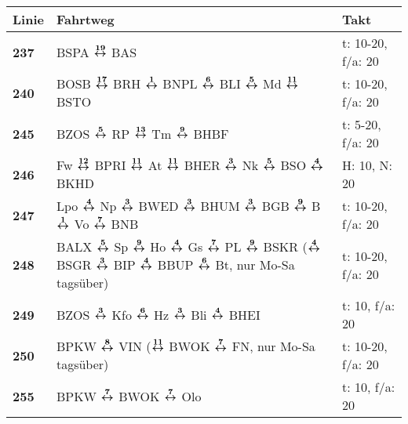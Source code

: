 \begin{minipage}[t]{0.45\textwidth}
\begin{tabular}{>{\bfseries}L{1.2cm}L{9.0cm}L{3.0cm}}
{\bfseries Linie} & {\bfseries Fahrtweg} & {\bfseries Takt} \\
\hline
\bus{} 237    & BSPA $\xarwe{19}$ BAS                                                                                                                                               & t: 10-20, f/a: 20          \\
\bus{} 240    & BOSB $\xarwe{17}$ BRH $\xarwe{1}$ BNPL $\xarwe{6}$ BLI $\xarwe{5}$ Md $\xarwe{11}$ BSTO                                                                             & t: 10-20, f/a: 20          \\
\bus{} 245    & BZOS $\xarwe{5}$ RP $\xarwe{13}$ Tm $\xarwe{9}$ BHBF             & t: 5-20, f/a: 20           \\
\bus{} 246    & Fw $\xarwe{12}$ BPRI $\xarwe{11}$ At $\xarwe{11}$ BHER $\xarwe{3}$ Nk $\xarwe{5}$ BSO $\xarwe{4}$ BKHD                                                                                                             & H: 10, N: 20               \\
\bus{} 247    & Lpo $\xarwe{4}$ Np $\xarwe{3}$ BWED $\xarwe{3}$ BHUM $\xarwe{3}$ BGB $\xarwe{9}$ B $\xarwe{1}$ Vo $\xarwe{7}$ BNB                                                   & t: 10-20, f/a: 20          \\
\bus{} 248    & BALX $\xarwe{5}$ Sp $\xarwe{9}$ Ho $\xarwe{4}$ Gs $\xarwe{7}$ PL $\xarwe{9}$ BSKR ($\xarwe{4}$ BSGR $\xarwe{3}$ BIP $\xarwe{4}$ BBUP $\xarwe{6}$ Bt, %
                nur Mo-Sa tagsüber)                                                                                                                                                 & t: 10-20, f/a: 20          \\
\bus{} 249    & BZOS $\xarwe{3}$ Kfo $\xarwe{6}$ Hz $\xarwe{3}$ Bli $\xarwe{4}$ BHEI                                                                                                & t: 10, f/a: 20             \\
\bus{} 250    & BPKW $\xarwe{8}$ VIN ($\xarwe{11}$ BWOK $\xarwe{7}$ FN, nur Mo-Sa tagsüber)                                                                                         & t: 10-20, f/a: 20          \\
\bus{} 255    & BPKW $\xarwe{7}$ BWOK $\xarwe{7}$ Olo                                                                                                                               & t: 10, f/a: 20             \\

\end{tabular}
\end{minipage}
